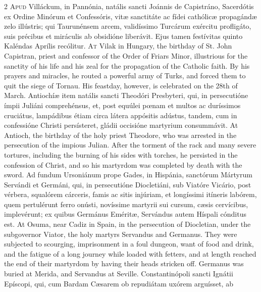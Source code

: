\begin{paracol}{2}
\lettrine[lines=2]{A}{pud} Villáckum, in 
 Pannónia, natális sancti Joánnis de Capistráno, Sacerdótis ex Ordine Minórum 
 et Confessóris, vitæ sanctitáte ac fídei cathólicæ propagándæ zelo illústris; 
 qui Taurunénsem arcem, validíssimo Turcárum exércitu profligáto, suis 
 précibus et miráculis ab obsidióne liberávit. Ejus tamen festívitas 
 quinto Kaléndas Aprílis recólitur.
\switchcolumn
{}
\lettrine[lines=2]{A}{t} Vilak in Hungary, the birthday of 
 St. John Capistran, priest and confessor of the Order of Friars Minor, 
 illustrious for the sanctity of his life and his zeal for the propagation of 
 the Catholic faith. By his prayers and miracles, he routed a powerful 
 army of Turks, and forced them to quit the siege of Tornau. His 
 feastday, however, is celebrated on the 28th of March.
\switchcolumn*
{}
Antiochíæ item natális 
 sancti Theodóri Presbyteri, qui, in persecutióne ímpii Juliáni comprehénsus, 
 et, post equúlei pœnam et multos ac duríssimos cruciátus, lampádibus étiam 
 circa látera appósitis adústus, tandem, cum in confessióne Christi 
 persísteret, gládii occisióne martyrium consummávit.
\switchcolumn
{}
At Antioch, the birthday of the holy 
 priest Theodore, who was arrested in the persecution of the impious Julian. 
 After the torment of the rack and many severe tortures, including the 
 burning of his sides with torches, he persisted in the confession of Christ, 
 and so his martyrdom was completed by death with the sword.
\switchcolumn*
{}
Ad fundum Ursoniánum 
 prope Gades, in Hispánia, sanctórum Mártyrum Servándi et Germáni, qui, in 
 persecutióne Diocletiáni, sub Viatóre Vicário, post vérbera, squalórem cárceris, famis ac sitis injúriam, et longíssimi itíneris labórem, quem 
 pertulérunt ferro onústi, novíssime martyrii sui cursum, cæsis cervícibus, 
 implevérunt; ex quibus Germánus Eméritæ, Servándus autem Híspali cónditus 
 est.
\switchcolumn
{}
At Osuma, near Cadiz in Spain, in 
 the persecution of Diocletian, under the subgovernor Viator, the holy 
 martyrs Servandus and Germanus. They were subjected to scourging, 
 imprisonment in a foul dungeon, want of food and drink, and the fatigue of a 
 long journey while loaded with fetters, and at length reached the end of 
 their martyrdom by having their heads stricken off. Germanus was 
 buried at Merida, and Servandus at Seville.
\switchcolumn*
{}
Constantinópoli sancti 
 Ignátii Epíscopi, qui, cum Bardam Cæsarem ob repudiátam uxórem arguísset, ab 

\end{paracol}
